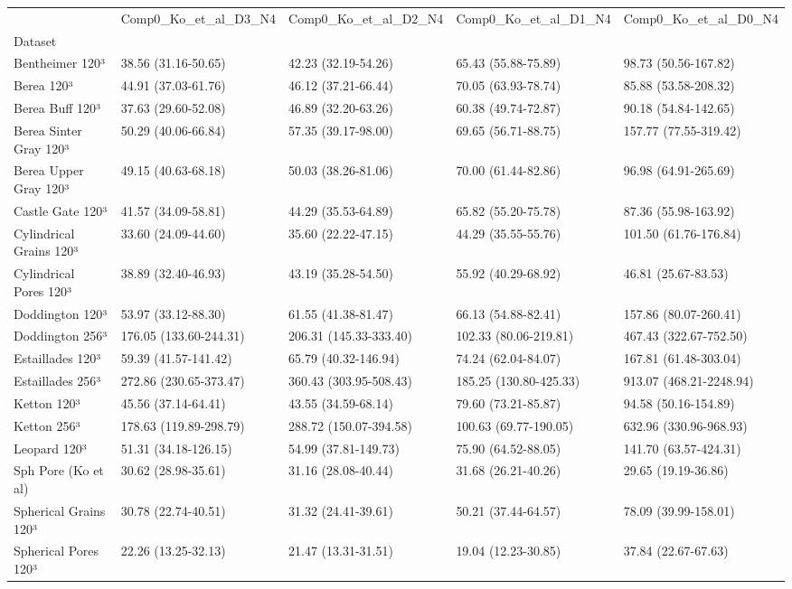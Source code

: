 \begin{tabular}{lllll}
\toprule
 & Comp0_Ko_et_al_D3_N4 & Comp0_Ko_et_al_D2_N4 & Comp0_Ko_et_al_D1_N4 & Comp0_Ko_et_al_D0_N4 \\
Dataset &  &  &  &  \\
\midrule
Bentheimer 120³ & 38.56 (31.16-50.65) & 42.23 (32.19-54.26) & 65.43 (55.88-75.89) & 98.73 (50.56-167.82) \\
Berea 120³ & 44.91 (37.03-61.76) & 46.12 (37.21-66.44) & 70.05 (63.93-78.74) & 85.88 (53.58-208.32) \\
Berea Buff 120³ & 37.63 (29.60-52.08) & 46.89 (32.20-63.26) & 60.38 (49.74-72.87) & 90.18 (54.84-142.65) \\
Berea Sinter Gray 120³ & 50.29 (40.06-66.84) & 57.35 (39.17-98.00) & 69.65 (56.71-88.75) & 157.77 (77.55-319.42) \\
Berea Upper Gray 120³ & 49.15 (40.63-68.18) & 50.03 (38.26-81.06) & 70.00 (61.44-82.86) & 96.98 (64.91-265.69) \\
Castle Gate 120³ & 41.57 (34.09-58.81) & 44.29 (35.53-64.89) & 65.82 (55.20-75.78) & 87.36 (55.98-163.92) \\
Cylindrical Grains 120³ & 33.60 (24.09-44.60) & 35.60 (22.22-47.15) & 44.29 (35.55-55.76) & 101.50 (61.76-176.84) \\
Cylindrical Pores 120³ & 38.89 (32.40-46.93) & 43.19 (35.28-54.50) & 55.92 (40.29-68.92) & 46.81 (25.67-83.53) \\
Doddington 120³ & 53.97 (33.12-88.30) & 61.55 (41.38-81.47) & 66.13 (54.88-82.41) & 157.86 (80.07-260.41) \\
Doddington 256³ & 176.05 (133.60-244.31) & 206.31 (145.33-333.40) & 102.33 (80.06-219.81) & 467.43 (322.67-752.50) \\
Estaillades 120³ & 59.39 (41.57-141.42) & 65.79 (40.32-146.94) & 74.24 (62.04-84.07) & 167.81 (61.48-303.04) \\
Estaillades 256³ & 272.86 (230.65-373.47) & 360.43 (303.95-508.43) & 185.25 (130.80-425.33) & 913.07 (468.21-2248.94) \\
Ketton 120³ & 45.56 (37.14-64.41) & 43.55 (34.59-68.14) & 79.60 (73.21-85.87) & 94.58 (50.16-154.89) \\
Ketton 256³ & 178.63 (119.89-298.79) & 288.72 (150.07-394.58) & 100.63 (69.77-190.05) & 632.96 (330.96-968.93) \\
Leopard 120³ & 51.31 (34.18-126.15) & 54.99 (37.81-149.73) & 75.90 (64.52-88.05) & 141.70 (63.57-424.31) \\
Sph Pore (Ko et al) & 30.62 (28.98-35.61) & 31.16 (28.08-40.44) & 31.68 (26.21-40.26) & 29.65 (19.19-36.86) \\
Spherical Grains 120³ & 30.78 (22.74-40.51) & 31.32 (24.41-39.61) & 50.21 (37.44-64.57) & 78.09 (39.99-158.01) \\
Spherical Pores 120³ & 22.26 (13.25-32.13) & 21.47 (13.31-31.51) & 19.04 (12.23-30.85) & 37.84 (22.67-67.63) \\
\bottomrule
\end{tabular}
